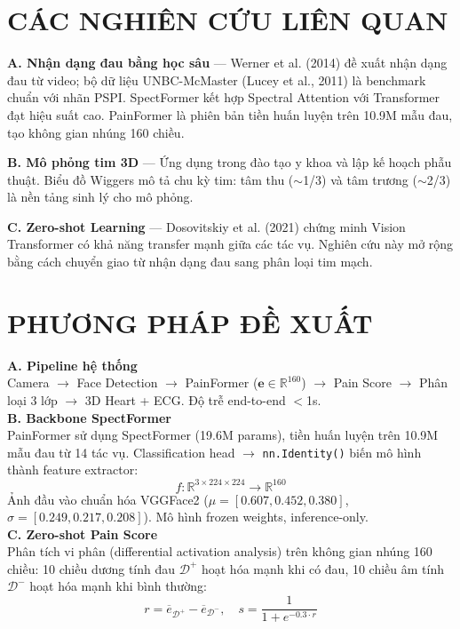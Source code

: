 \documentclass[journal]{IEEEtran}
\begin{document}
\section{CÁC NGHIÊN CỨU LIÊN QUAN}

\textbf{A. Nhận dạng đau bằng học sâu} — Werner et al. (2014) đề xuất nhận dạng đau từ video; bộ dữ liệu UNBC-McMaster (Lucey et al., 2011) là benchmark chuẩn với nhãn PSPI. SpectFormer kết hợp Spectral Attention với Transformer đạt hiệu suất cao. PainFormer là phiên bản tiền huấn luyện trên 10.9M mẫu đau, tạo không gian nhúng 160 chiều.

\textbf{B. Mô phỏng tim 3D} — Ứng dụng trong đào tạo y khoa và lập kế hoạch phẫu thuật. Biểu đồ Wiggers mô tả chu kỳ tim: tâm thu ($\sim$1/3) và tâm trương ($\sim$2/3) là nền tảng sinh lý cho mô phỏng.

\textbf{C. Zero-shot Learning} — Dosovitskiy et al. (2021) chứng minh Vision Transformer có khả năng transfer mạnh giữa các tác vụ. Nghiên cứu này mở rộng bằng cách chuyển giao từ nhận dạng đau sang phân loại tim mạch.

\section{PHƯƠNG PHÁP ĐỀ XUẤT}

\textbf{A. Pipeline hệ thống}\\
Camera $\to$ Face Detection $\to$ PainFormer ($\mathbf{e} \in \mathbb{R}^{160}$) $\to$ Pain Score $\to$ Phân loại 3 lớp $\to$ 3D Heart + ECG. Độ trễ end-to-end $<$1s.\\

\textbf{B. Backbone SpectFormer}\\
PainFormer sử dụng SpectFormer (19.6M params), tiền huấn luyện trên 10.9M mẫu đau từ 14 tác vụ. Classification head $\to$ \texttt{nn.Identity()} biến mô hình thành feature extractor:
\begin{equation}
    f: \mathbb{R}^{3 \times 224 \times 224} \to \mathbb{R}^{160}
\end{equation}
Ảnh đầu vào chuẩn hóa VGGFace2 ($\mu = [0.607, 0.452, 0.380]$, $\sigma = [0.249, 0.217, 0.208]$). Mô hình frozen weights, inference-only.\\

\textbf{C. Zero-shot Pain Score}\\
Phân tích vi phân (differential activation analysis) trên không gian nhúng 160 chiều: 10 chiều dương tính đau $\mathcal{D}^+$ hoạt hóa mạnh khi có đau, 10 chiều âm tính $\mathcal{D}^-$ hoạt hóa mạnh khi bình thường:
\begin{equation}
    r = \overline{e}_{\mathcal{D}^+} - \overline{e}_{\mathcal{D}^-}, \quad
    s = \frac{1}{1 + e^{-0.3 \cdot r}}
\end{equation}
\end{document}
